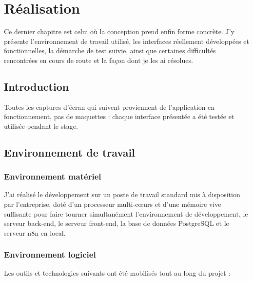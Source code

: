 \chapter{Réalisation}

Ce dernier chapitre est celui où la conception prend enfin forme concrète. J’y présente l’environnement de travail utilisé, les interfaces réellement développées et fonctionnelles, la démarche de test suivie, ainsi que certaines difficultés rencontrées en cours de route et la façon dont je les ai résolues.

\section{Introduction}
\label{sec_4_1}
Toutes les captures d’écran qui suivent proviennent de l’application en fonctionnement, pas de maquettes : chaque interface présentée a été testée et utilisée pendant le stage.

\section{Environnement de travail}
\label{sec_4_2}
\subsection{Environnement matériel}
\label{sec_4_2_1}
J’ai réalisé le développement sur un poste de travail standard mis à disposition par l’entreprise, doté d’un processeur multi-cœurs et d’une mémoire vive suffisante pour faire tourner simultanément l’environnement de développement, le serveur back-end, le serveur front-end, la base de données PostgreSQL et le serveur n8n en local.

\subsection{Environnement logiciel}
\label{sec_4_2_2}
Les outils et technologies suivants ont été mobilisés tout au long du projet :

